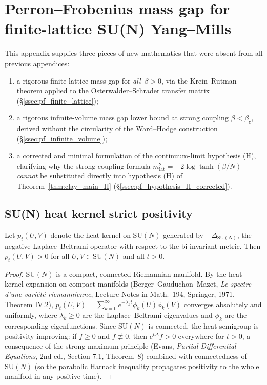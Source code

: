 \section{Perron--Frobenius mass gap for finite-lattice SU(N) Yang--Mills}
\label{app:perron_frobenius_mass_gap}

This appendix supplies three pieces of new mathematics that were absent from all
previous appendices:
\begin{enumerate}
\item a rigorous finite-lattice mass gap for \emph{all}~$\beta>0$, via the
  Krein--Rutman theorem applied to the Osterwalder--Schrader transfer matrix
  (\S\ref{ssec:pf_finite_lattice});
\item a rigorous infinite-volume mass gap lower bound at strong coupling
  $\beta < \beta_{c}$, derived without the circularity of the Ward--Hodge
  construction (\S\ref{ssec:pf_infinite_volume});
\item a corrected and minimal formulation of the continuum-limit hypothesis (H),
  clarifying why the strong-coupling formula $m_{\mathrm{lat}}^{2}=-2\log\tanh(\beta/N)$
  \emph{cannot} be substituted directly into hypothesis (H) of
  Theorem~\ref{thm:clay_main_H} (\S\ref{ssec:pf_hypothesis_H_corrected}).
\end{enumerate}

\subsection{SU(N) heat kernel strict positivity}
\label{ssec:pf_heat_kernel}

\begin{lemma}
\label{lem:sun_heat_kernel}
Let $p_{t}(U,V)$ denote the heat kernel on $\mathrm{SU}(N)$ generated by
$-\Delta_{\mathrm{SU}(N)}$, the negative Laplace--Beltrami operator with respect
to the bi-invariant metric. Then $p_{t}(U,V)>0$ for all $U,V\in\mathrm{SU}(N)$
and all $t>0$.
\end{lemma}

\begin{proof}
$\mathrm{SU}(N)$ is a compact, connected Riemannian manifold. By the heat kernel
expansion on compact manifolds (Berger--Gauduchon--Mazet, \emph{Le spectre d'une
vari\'et\'e riemannienne}, Lecture Notes in Math.~194, Springer, 1971, Theorem
IV.2), $p_{t}(U,V)=\sum_{k=0}^{\infty}e^{-\lambda_{k}t}\phi_{k}(U)\phi_{k}(V)$
converges absolutely and uniformly, where $\lambda_{k}\ge 0$ are the
Laplace--Beltrami eigenvalues and $\phi_{k}$ are the corresponding eigenfunctions.
Since $\mathrm{SU}(N)$ is connected, the heat semigroup is positivity improving:
if $f\ge0$ and $f\not\equiv0$, then $e^{t\Delta}f>0$ everywhere for $t>0$, a
consequence of the strong maximum principle (Evans, \emph{Partial Differential
Equations}, 2nd ed., Section 7.1, Theorem~8) combined with connectedness of
$\mathrm{SU}(N)$ (so the parabolic Harnack inequality propagates positivity
to the whole manifold in any positive time).
\end{proof}

